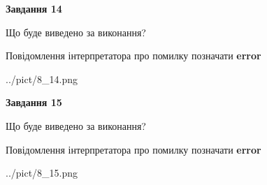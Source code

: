 \documentclass[11pt, ukrainian]{article}
\begin{document}
{\begin {large}
{\begin {center}\textbf{Завдання 14}\end {center}}\par
Що буде виведено за виконання? \par
Повідомлення інтерпретатора про помилку позначати \textbf{error}

\begin{center}
	{../pict/8_14.png}
\end{center}
\newpage

{\begin {center}\textbf{Завдання 15}\end {center}}\par
Що буде виведено за виконання? \par
Повідомлення інтерпретатора про помилку позначати \textbf{error}

\begin{center}
	{../pict/8_15.png}
\end{center}
\newpage

\end {large}}
\end{document}
